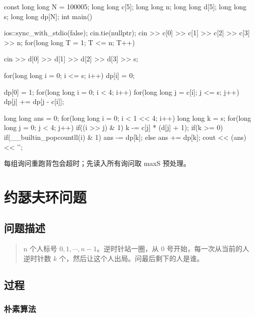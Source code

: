 \begin{codeline}
const long long N = 100005;
long long c[5];
long long n;
long long d[5];
long long s;
long long dp[N];
int main() {
    ios::sync_with_stdio(false);
    cin.tie(nullptr);
    cin >> c[0] >> c[1] >> c[2] >> c[3] >> n;
    for(long long T = 1; T <= n; T++) {
        cin >> d[0] >> d[1] >> d[2] >> d[3] >> s;

        for(long long i = 0; i <= s; i++) {
            dp[i] = 0;
        }

        dp[0] = 1;
        for(long long i = 0; i < 4; i++) {
            for(long long j = c[i]; j <= s; j++) {
                dp[j] += dp[j - c[i]];
            }
        }

        long long ans = 0;
        for(long long i = 0; i < 1 << 4; i++) {
            long long k = s;
            for(long long j = 0; j < 4; j++) {
                if((i >> j) & 1) {
                    k -= c[j] * (d[j] + 1);
                }
            }
            if(k >= 0) {
                if(__builtin_popcountll(i) & 1) {
                    ans -= dp[k];
                } else {
                    ans += dp[k];
                }
            }
        }
        cout << (ans) << '\n';
    }
}
\end{codeline}
\begin{warnbox}
每组询问重跑背包会超时；先读入所有询问取 maxS 预处理。
\end{warnbox}

\section{约瑟夫环问题}
\subsection{问题描述}\label{ux95eeux9898ux63cfux8ff0}

\begin{quote}
n 个人标号 \(0,1,\cdots, n-1\)。逆时针站一圈，从 \(0\) 号开始，每一次从当前的人逆时针数 \(k\) 个，然后让这个人出局。问最后剩下的人是谁。
\end{quote}

\subsection{过程}\label{ux8fc7ux7a0b}

\subsubsection{朴素算法}\label{ux6734ux7d20ux7b97ux6cd5}

